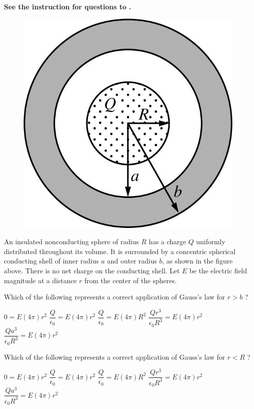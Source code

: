 \textbf{See the instruction for questions  to .}

\begin{figure}[H]
\centering
\includegraphics[scale=0.25]{images/img-006-020.png}
\end{figure}

An insulated nonconducting sphere of radius $R$ has a charge $Q$ uniformly distributed throughout its volume. It is surrounded by a concentric spherical conducting shell of inner radius $a$ and outer radius $b$, as shown in the figure above. There is no net charge on the conducting shell. Let $E$ be the electric field magnitude at a distance $r$ from the center of the spheres.

\begin{questions}\setcounter{question}{7}\question
Which of the following represents a correct application of Gauss's law for $r>b$ ?

\begin{choices}
\choice $0=E(4 \pi) r^{2}$
\choice $\dfrac{Q}{\epsilon_{0}}=E(4 \pi) r^{2}$
\choice $\dfrac{Q}{\epsilon_{0}}=E(4 \pi) R^{2}$
\choice $\dfrac{Q r^{3}}{\epsilon_{0} R^{3}}=E(4 \pi) r^{2}$
\choice $\dfrac{Q a^{3}}{\epsilon_{0} R^{3}}=E(4 \pi) r^{2}$
\end{choices}\end{questions}

\begin{questions}\setcounter{question}{8}\question
Which of the following represents a correct application of Gauss's law for $r<R$ ?

\begin{choices}
\choice $0=E(4 \pi) r^{2}$
\choice $\dfrac{Q}{\epsilon_{0}}=E(4 \pi) r^{2}$
\choice $\dfrac{Q}{\epsilon_{0}}=E(4 \pi) R^{2}$
\choice $\dfrac{Q r^{3}}{\epsilon_{0} R^{3}}=E(4 \pi) r^{2}$
\choice $\dfrac{Q a^{3}}{\epsilon_{0} R^{3}}=E(4 \pi) r^{2}$
\end{choices}\end{questions}

